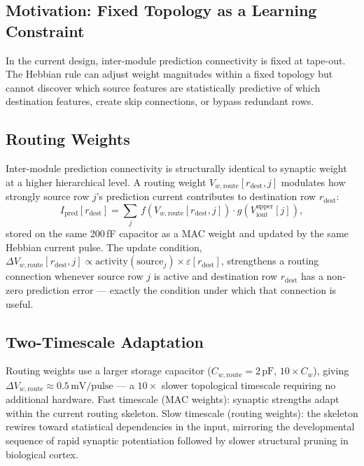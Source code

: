 \documentclass[journal,10pt,twoside]{IEEEtran}
\begin{document}
\subsection{Motivation: Fixed Topology as a Learning Constraint}

In the current design, inter-module prediction connectivity is fixed at
tape-out.
The Hebbian rule can adjust weight magnitudes within a fixed topology but
cannot discover which source features are statistically predictive of which
destination features, create skip connections, or bypass redundant rows.

\subsection{Routing Weights}

Inter-module prediction connectivity is structurally identical to synaptic
weight at a higher hierarchical level.
A routing weight $V_{w,\text{route}}[r_\text{dest}, j]$ modulates how
strongly source row $j$'s prediction current contributes to destination
row $r_\text{dest}$:
\begin{equation}
I_\text{pred}[r_\text{dest}] = \sum_j\,
  f\!\left(V_{w,\text{route}}[r_\text{dest},j]\right) \cdot
  g\!\left(V_\text{iout}^\text{upper}[j]\right),
\label{eq:routing}
\end{equation}
stored on the same 200\,fF capacitor as a MAC weight and updated by the
same Hebbian current pulse.
The update condition,
$\Delta V_{w,\text{route}}[r_\text{dest}, j] \propto
  \text{activity}(\text{source}_j) \times \varepsilon[r_\text{dest}]$,
strengthens a routing connection whenever source row $j$ is active and
destination row $r_\text{dest}$ has a non-zero prediction error — exactly
the condition under which that connection is useful.

\subsection{Two-Timescale Adaptation}

Routing weights use a larger storage capacitor
($C_{w,\text{route}} = 2\,\text{pF}$, $10\times C_w$), giving
$\Delta V_{w,\text{route}} \approx 0.5\,\text{mV/pulse}$ — a $10\times$
slower topological timescale requiring no additional hardware.
Fast timescale (MAC weights): synaptic strengths adapt within the current
routing skeleton.
Slow timescale (routing weights): the skeleton rewires toward statistical
dependencies in the input, mirroring the developmental sequence of rapid
synaptic potentiation followed by slower structural pruning in biological
cortex.
\end{document}
